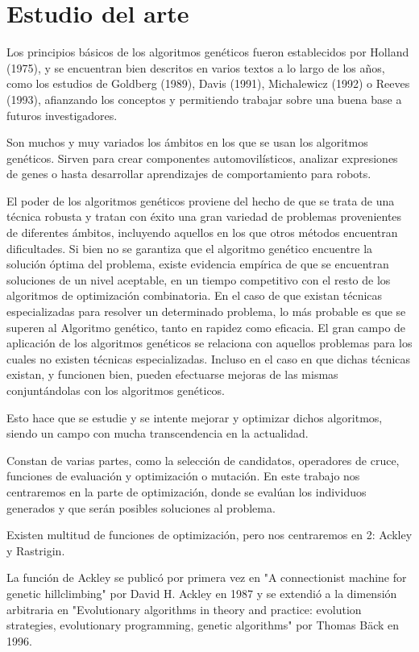 \chapter{Estudio del arte}
\bigskip

Los principios básicos de los algoritmos genéticos fueron establecidos por Holland (1975), y se encuentran bien descritos en varios textos a lo largo de los años, como los estudios de Goldberg (1989), Davis (1991), Michalewicz (1992) o Reeves (1993), afianzando los conceptos y permitiendo trabajar sobre una buena base a futuros investigadores.

\bigskip
Son muchos y muy variados los ámbitos en los que se usan los algoritmos genéticos. Sirven para crear componentes automovilísticos, analizar expresiones de genes o hasta desarrollar aprendizajes de comportamiento para robots.

\bigskip
El poder de los algoritmos genéticos proviene del hecho de que se trata de una técnica robusta y tratan con éxito una gran variedad de problemas provenientes de diferentes ámbitos, incluyendo aquellos en los que otros métodos encuentran dificultades. Si bien no se garantiza que el algoritmo genético encuentre la solución óptima del problema, existe evidencia empírica de que se encuentran soluciones de un nivel aceptable, en un tiempo competitivo con el resto de los algoritmos de optimización combinatoria. En el caso de que existan técnicas especializadas para resolver un determinado problema, lo más probable es que se superen al Algoritmo genético, tanto en rapidez como eficacia. El gran campo de aplicación de los algoritmos genéticos se relaciona con aquellos problemas para los cuales no existen técnicas especializadas. Incluso en el caso en que dichas técnicas existan, y funcionen bien, pueden efectuarse mejoras de las mismas conjuntándolas con los algoritmos genéticos.

Esto hace que se estudie y se intente mejorar y optimizar dichos algoritmos, siendo un campo con mucha transcendencia en la actualidad.

\bigskip
Constan de varias partes, como la selección de candidatos, operadores de cruce, funciones de evaluación y optimización o mutación. En este trabajo nos centraremos en la parte de optimización, donde se evalúan los individuos generados y que serán posibles soluciones al problema.

Existen multitud de funciones de optimización, pero nos centraremos en 2: Ackley y Rastrigin.

\bigskip
La función de Ackley se publicó por primera vez en "A connectionist machine for genetic hillclimbing" por David H. Ackley en 1987 y se extendió a la dimensión arbitraria en "Evolutionary algorithms in theory and practice: evolution strategies, evolutionary programming, genetic algorithms" por Thomas Bäck en 1996.

